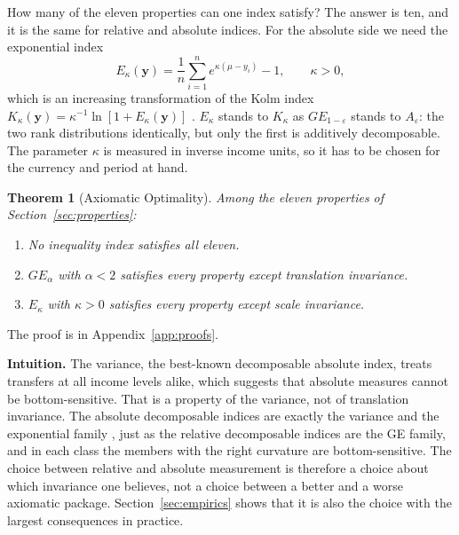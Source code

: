 \documentclass[12pt]{article}
\theoremstyle{plain}
\newtheorem{theorem}{Theorem}
\theoremstyle{definition}
\theoremstyle{remark}
\newcommand{\bfy}{\mathbf{y}}
\begin{document}
How many of the eleven properties can one index satisfy?
The answer is ten, and it is the same for relative and absolute indices.
For the absolute side we need the exponential index
\begin{equation}\label{eq:expo}
E_\kappa(\bfy) = \frac{1}{n}\sum_{i=1}^n e^{\kappa(\mu - y_i)} - 1, \qquad \kappa > 0,
\end{equation}
which is an increasing transformation of the Kolm index $K_\kappa(\bfy) = \kappa^{-1}\ln[1 + E_\kappa(\bfy)]$ \citep{Kolm1976a}.
$E_\kappa$ stands to $K_\kappa$ as $GE_{1-\varepsilon}$ stands to $A_\varepsilon$: the two rank distributions identically, but only the first is additively decomposable.
The parameter $\kappa$ is measured in inverse income units, so it has to be chosen for the currency and period at hand.

\begin{theorem}[Axiomatic Optimality]\label{thm:optimality}
Among the eleven properties of Section~\ref{sec:properties}:
\begin{enumerate}[label=(\roman*)]
    \item No inequality index satisfies all eleven.
    \item $GE_\alpha$ with $\alpha < 2$ satisfies every property except translation invariance.
    \item $E_\kappa$ with $\kappa > 0$ satisfies every property except scale invariance.
\end{enumerate}
\end{theorem}

The proof is in Appendix~\ref{app:proofs}.

\textbf{Intuition.}
The variance, the best-known decomposable absolute index, treats transfers at all income levels alike, which suggests that absolute measures cannot be bottom-sensitive.
That is a property of the variance, not of translation invariance.
The absolute decomposable indices are exactly the variance and the exponential family \citep{Chakravarty1998,Bosmans2010}, just as the relative decomposable indices are the GE family, and in each class the members with the right curvature are bottom-sensitive.
The choice between relative and absolute measurement is therefore a choice about which invariance one believes, not a choice between a better and a worse axiomatic package.
Section~\ref{sec:empirics} shows that it is also the choice with the largest consequences in practice.

\end{document}
